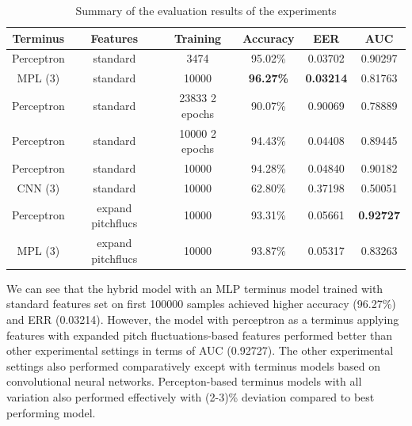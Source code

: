 \documentclass{article}
\begin{document}
\begin{table}[htbp]
			\caption{Summary of the evaluation results of the experiments}
			\vspace{10pt}
			\centering
			\footnotesize
			\begin{tabular}{|c | c | c | c | c | c|}
				\hline
				\textbf{Terminus} & \textbf{Features} & \textbf{Training} & \textbf{Accuracy} & \textbf{EER} & \textbf{AUC} \\
				\hline 
				Perceptron & standard & 3474 & 95.02\% & 0.03702 & 0.90297 \\ \hline
				MPL (3) & standard & 10000 & \textbf{96.27\%} & \textbf{0.03214} & 0.81763 \\ \hline
				Perceptron & standard & 23833 2 epochs & 90.07\% & 0.90069 & 0.78889 \\ \hline
				Perceptron & standard & 10000 2 epochs & 94.43\% & 0.04408 & 0.89445 \\ \hline
				Perceptron & standard & 10000 & 94.28\% & 0.04840 & 0.90182 \\ \hline
				CNN (3) & standard & 10000 & 62.80\% & 0.37198 & 0.50051 \\ \hline
				Perceptron & expand pitch\-flucs & 10000 & 93.31\% & 0.05661 & \textbf{0.92727} \\ \hline
				MPL (3) & expand pitch\-flucs & 10000 & 93.87\% & 0.05317 & 0.83263 \\ \hline
			\end{tabular}
			\label{table:eval-results}
		\end{table}

We can see that the hybrid model with an MLP terminus model trained with standard features set on first 100000 samples achieved higher accuracy (96.27\%) and ERR (0.03214). However, the model with perceptron as a terminus applying features with expanded pitch fluctuations-based features performed better than other experimental settings in terms of AUC (0.92727). The other experimental settings also performed comparatively except with terminus models based on convolutional neural networks. Percepton-based terminus models with all variation also performed effectively with (2-3)\% deviation compared to best performing model.
\end{document}
